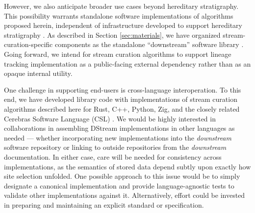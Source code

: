 However, we also anticipate broader use cases beyond hereditary stratigraphy.
This possibility warrants standalone software implementations of algorithms proposed herein, independent of infrastructure developed to support hereditary stratigraphy \citep{moreno2022hstrat}.
As described in Section \ref{sec:materials}, we have organized stream-curation-specific components as the standalone ``downstream'' software library \citep{moreno2024downstream}.
Going forward, we intend for stream curation algorithms to support lineage tracking implementation as a public-facing external dependency rather than as an opaque internal utility.

One challenge in supporting end-users is cross-language interoperation.
To this end, we have developed library code with implementations of stream curation algorithms described here for Rust, C++, Python, Zig, and the closely related Cerebras Software Language (CSL) \citep{moreno2024hsurf,moreno2024downstream,moreno2024wse}.
We would be highly interested in collaborations in assembling DStream implementations in other languages as needed --- whether incorporating new implementations into the \textit{downstream} software repository or linking to outside repositories from the \textit{downstream} documentation.
In either case, care will be needed for consistency across implementations, as the semantics of stored data depend subtly upon exactly how site selection unfolded.
One possible approach to this issue would be to simply designate a canonical implementation and provide language-agnostic tests to validate other implementations against it.
Alternatively, effort could be invested in preparing and maintaining an explicit standard or specification.
